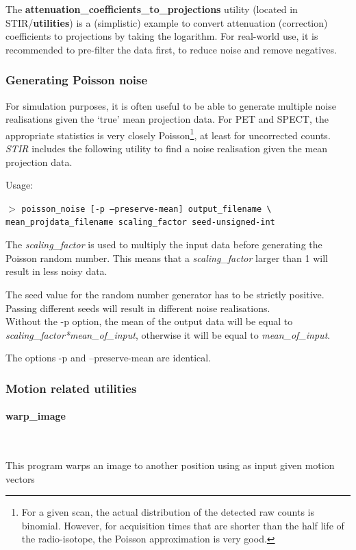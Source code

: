 \documentclass{article}
\newcommand{\subsubsubsection}[1]{\paragraph{#1}\mbox{} \\}
\newcommand{\cmdline}[1]{\par \noindent $>$ \texttt{#1}\par}
\begin{document}
{{The \textbf{attenuation\_coefficients\_to\_projections} utility 
(located in STIR/\textbf{utilities}) is a (simplistic) example to convert
attenuation (correction) coefficients to projections by taking the logarithm.
For real-world use, it is recommended to pre-filter the data first, to reduce noise
and remove negatives.


\subsubsection{
Generating Poisson noise}

For simulation purposes, it is often useful to be able to generate 
multiple noise realisations given the `true' mean projection data. 
For PET and SPECT, the appropriate statistics is very closely 
Poisson\footnote{{\small For a given scan, the actual distribution of 
the detected raw counts is binomial. However, for acquisition 
times that are shorter than the half life of the radio-isotope, 
the Poisson approximation is very good.}}, 
at least for uncorrected counts. \textit{STIR} includes the following 
utility to find a noise realisation given the mean projection 
data.


Usage:
\cmdline{poisson\_noise [-p {\textbar} --preserve-mean] output\_filename 
{\textbackslash}\\
mean\_projdata\_filename scaling\_factor seed-unsigned-int}


The \textit{scaling\_factor} is used to multiply the input data before 
generating the Poisson random number. This means that a \textit{scaling\_factor} 
larger than 1 will result in less noisy data.


The seed value for the random number generator has to be strictly 
positive. Passing different seeds will result in different noise 
realisations.\\
Without the -p option, the mean of the output data will be equal 
to \textit{scaling\_factor*mean\_of\_input}, otherwise it will be equal 
to \textit{mean\_of\_input}.


The options -p and --preserve-mean are identical.


\subsubsection{Motion related utilities}
\label{sec:motionRelatedUtilities}
{ \subsubsubsection{warp\_image}
}
This program warps an image to another position using as input given motion vectors 

}}
\end{document}
